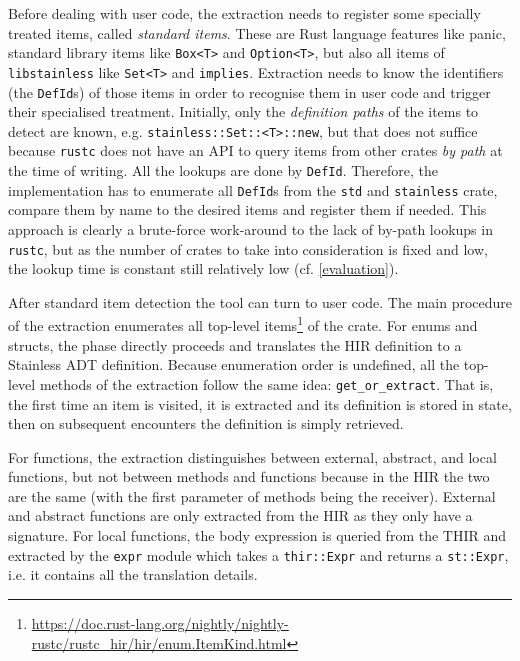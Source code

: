 Before dealing with user code, the extraction needs to register some specially
treated items, called \emph{standard items}. These are Rust language features
like panic, standard library items like \lstinline!Box<T>! and
\lstinline!Option<T>!, but also all items of \lstinline!libstainless! like
\lstinline!Set<T>! and \lstinline!implies!. Extraction needs to know the
identifiers (the \lstinline!DefId!s) of those items in order to recognise them
in user code and trigger their specialised treatment. Initially, only the
\emph{definition paths} of the items to detect are known, e.g.
\lstinline!stainless::Set::<T>::new!, but that does not suffice because
\lstinline!rustc! does not have an API to query items from other crates \emph{by
path} at the time of writing. All the lookups are done by \lstinline!DefId!.
Therefore, the implementation has to enumerate all \lstinline!DefId!s from the
\lstinline!std! and \lstinline!stainless! crate, compare them by name to the
desired items and register them if needed. This approach is clearly a
brute-force work-around to the lack of by-path lookups in \lstinline!rustc!, but
as the number of crates to take into consideration is fixed and low, the lookup
time is constant still relatively low (cf. \autoref{evaluation}).

After standard item detection the tool can turn to user code. The main procedure
of the extraction enumerates all top-level
items\footnote{\url{https://doc.rust-lang.org/nightly/nightly-rustc/rustc_hir/hir/enum.ItemKind.html}}
of the crate. For enums and structs, the phase directly proceeds and translates
the HIR definition to a Stainless ADT definition. Because enumeration order is
undefined, all the top-level methods of the extraction follow the same idea:
\lstinline!get_or_extract!. That is, the first time an item is visited, it is
extracted and its definition is stored in state, then on subsequent encounters
the definition is simply retrieved.

For functions, the extraction distinguishes between external, abstract, and
local functions, but not between methods and functions because in the HIR the
two are the same (with the first parameter of methods being the receiver).
External and abstract functions are only extracted from the HIR as they only
have a signature. For local functions, the body expression is queried from the
THIR and extracted by the \lstinline!expr! module which takes a
\lstinline!thir::Expr! and returns a \lstinline!st::Expr!, i.e. it contains all
the translation details.

